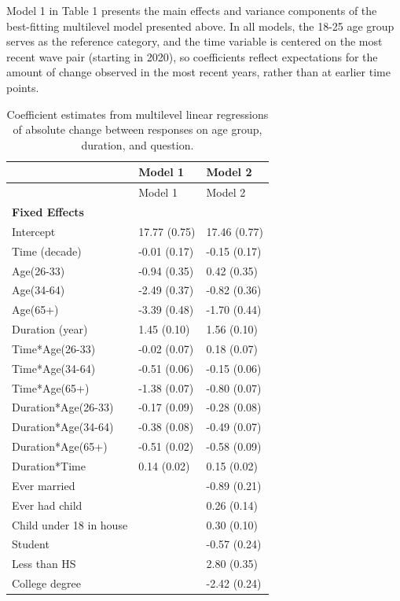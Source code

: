 \documentclass[
  12pt,
]{article}
\begin{document}
Model 1 in Table 1 presents the main effects and variance components of the best-fitting multilevel model presented above. In all models, the 18-25 age group serves as the reference category, and the time variable is centered on the most recent wave pair (starting in 2020), so coefficients reflect expectations for the amount of change observed in the most recent years, rather than at earlier time points.

\pagebreak

\begin{longtable}[]{@{}lll@{}}
\caption{Coefficient estimates from multilevel linear regressions of absolute change between responses on age group, duration, and question.}\tabularnewline
\toprule\noalign{}
& Model 1 & Model 2 \\
\midrule\noalign{}
\endfirsthead
\toprule\noalign{}
& Model 1 & Model 2 \\
\midrule\noalign{}
\endhead
\bottomrule\noalign{}
\endlastfoot
\textbf{Fixed Effects} & & \\
Intercept & 17.77 (0.75) & 17.46 (0.77) \\
Time (decade) & -0.01 (0.17) & -0.15 (0.17) \\
Age(26-33) & -0.94 (0.35) & 0.42 (0.35) \\
Age(34-64) & -2.49 (0.37) & -0.82 (0.36) \\
Age(65+) & -3.39 (0.48) & -1.70 (0.44) \\
Duration (year) & 1.45 (0.10) & 1.56 (0.10) \\
Time*Age(26-33) & -0.02 (0.07) & 0.18 (0.07) \\
Time*Age(34-64) & -0.51 (0.06) & -0.15 (0.06) \\
Time*Age(65+) & -1.38 (0.07) & -0.80 (0.07) \\
Duration*Age(26-33) & -0.17 (0.09) & -0.28 (0.08) \\
Duration*Age(34-64) & -0.38 (0.08) & -0.49 (0.07) \\
Duration*Age(65+) & -0.51 (0.02) & -0.58 (0.09) \\
Duration*Time & 0.14 (0.02) & 0.15 (0.02) \\
Ever married & & -0.89 (0.21) \\
Ever had child & & 0.26 (0.14) \\
Child under 18 in house & & 0.30 (0.10) \\
Student & & -0.57 (0.24) \\
Less than HS & & 2.80 (0.35) \\
College degree & & -2.42 (0.24) \\

\end{longtable}
\end{document}
